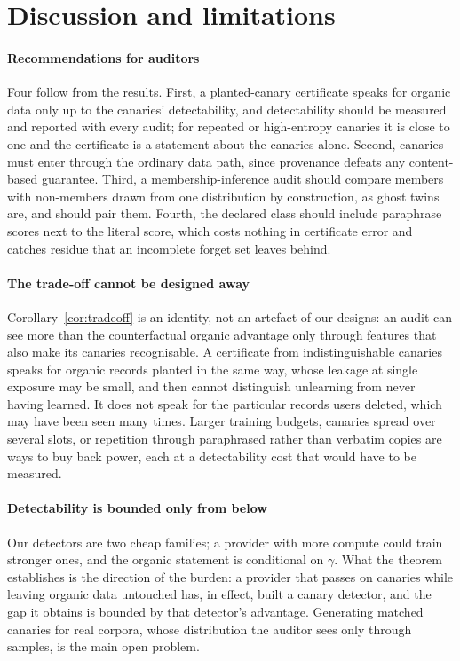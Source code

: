 \section{Discussion and limitations}\label{sec:discussion}

\paragraph{Recommendations for auditors} Four follow from the results. First, a
planted-canary certificate speaks for organic data only up to the canaries' detectability,
and detectability should be measured and reported with every audit; for repeated or
high-entropy canaries it is close to one and the certificate is a statement about the canaries
alone. Second, canaries must enter through the ordinary data path, since provenance defeats
any content-based guarantee. Third, a membership-inference audit should compare members with
non-members drawn from one distribution by construction, as ghost twins are, and should pair
them. Fourth, the declared class should include paraphrase scores next to the literal score,
which costs nothing in certificate error and catches residue that an incomplete forget set
leaves behind.

\paragraph{The trade-off cannot be designed away} Corollary~\ref{cor:tradeoff} is an identity,
not an artefact of our designs: an audit can see more than the counterfactual organic advantage
only through features that also make its canaries recognisable. A certificate from
indistinguishable canaries speaks for organic records planted in the same way, whose leakage at
single exposure may be small, and then cannot distinguish unlearning from never having learned.
It does not speak for the particular records users deleted, which may have been seen many
times. Larger training
budgets, canaries spread over several slots, or repetition through paraphrased rather than
verbatim copies are ways to buy back power, each at a detectability cost that would have to
be measured.

\paragraph{Detectability is bounded only from below} Our detectors are two cheap families; a
provider with more compute could train stronger ones, and the organic statement is conditional
on $\gamma$. What the theorem establishes is the direction of the burden: a provider that
passes on canaries while leaving organic data untouched has, in effect, built a canary
detector, and the gap it obtains is bounded by that detector's advantage. Generating matched
canaries for real corpora, whose distribution the auditor sees only through samples, is the
main open problem.

